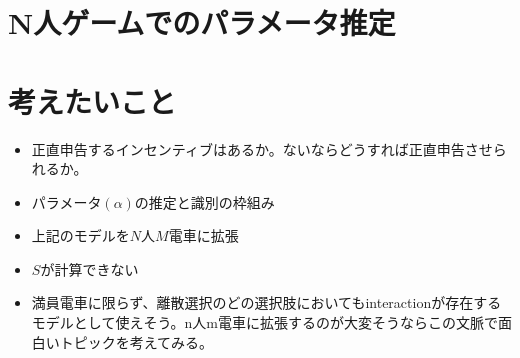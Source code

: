\documentclass{jsarticle}
\begin{document}
\section{N人ゲームでのパラメータ推定}

\section{考えたいこと}
\begin{itemize}
	\item 正直申告するインセンティブはあるか。ないならどうすれば正直申告させられるか。
	\item パラメータ$(\alpha)$の推定と識別の枠組み
	\item 上記のモデルを$N$人$M$電車に拡張
	\item $S$が計算できない
	\item 満員電車に限らず、離散選択のどの選択肢においてもinteractionが存在するモデルとして使えそう。n人m電車に拡張するのが大変そうならこの文脈で面白いトピックを考えてみる。
\end{itemize}
\end{document}
